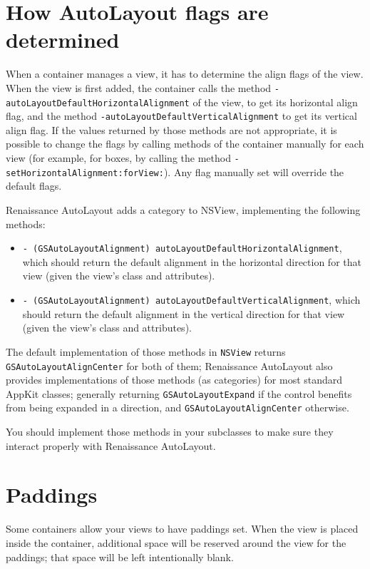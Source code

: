 \section{How AutoLayout flags are determined}
When a container manages a view, it has to determine the align flags
of the view.  When the view is first added, the container calls the
method \texttt{-autoLayoutDefaultHorizontalAlignment} of the view, to
get its horizontal align flag, and the method
\texttt{-autoLayoutDefaultVerticalAlignment} to get its vertical align
flag.  If the values returned by those methods are not appropriate, it
is possible to change the flags by calling methods of the container
manually for each view (for example, for boxes, by calling the method
\texttt{-setHorizontalAlignment:forView:}).  Any flag manually set will
override the default flags.

Renaissance AutoLayout adds a category to NSView, implementing the
following methods:

\begin{itemize}
\item \texttt{- (GSAutoLayoutAlignment)
  autoLayoutDefaultHorizontalAlignment}, which should return the
  default alignment in the horizontal direction for that view (given
  the view's class and attributes).
\item \texttt{- (GSAutoLayoutAlignment)
  autoLayoutDefaultVerticalAlignment}, which should return the default
  alignment in the vertical direction for that view (given the view's
  class and attributes).
\end{itemize}

The default implementation of those methods in \texttt{NSView} returns
\texttt{GSAutoLayoutAlignCenter} for both of them; Renaissance AutoLayout 
also provides implementations of those methods (as categories) for
most standard AppKit classes; generally returning
\texttt{GSAutoLayoutExpand} if the control benefits from being expanded 
in a direction, and \texttt{GSAutoLayoutAlignCenter} otherwise.

You should implement those methods in your subclasses to make sure
they interact properly with Renaissance AutoLayout.

\section{Paddings}
Some containers allow your views to have paddings set.  When the view
is placed inside the container, additional space will be reserved
around the view for the paddings; that space will be left intentionally
blank.

